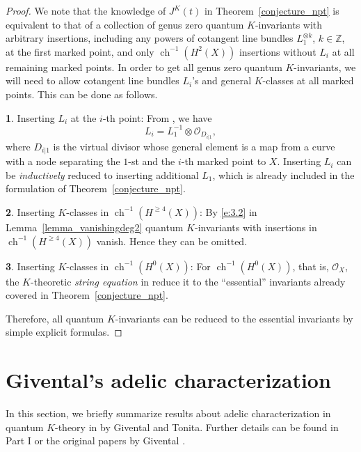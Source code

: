 \documentclass[11pt]{amsart}
\newtheorem*{main theorem*}{Main Theorem}
\theoremstyle{remark}
\numberwithin{equation}{section}
\newcommand{\op}{\operatorname}
\newcommand{\so}{\mathscr{O}}
\begin{document}
\begin{proof}
We note that the knowledge of $J^K (t)$ in Theorem~\ref{conjecture_npt} is equivalent to that of a collection of genus zero quantum $K$-invariants with arbitrary insertions, including any powers of cotangent line bundles $L_1^{\otimes k}$, $k\in \mathbb{Z}$, at the first marked point, and only $\op{ch}^{-1} (H^2(X))$ insertions without $L_i$ at all remaining marked points. 
In order to get all genus zero quantum $K$-invariants, we will need to allow cotangent line bundles $L_i$'s and general $K$-classes at all marked points. This can be done as follows.

\textbf{1}. Inserting $L_i$ at the $i$-th point: From \cite[(2)]{Lee_Pandharipande_2004}, we have
\[
 L_i = L_1^{-1} \otimes \so_{D_{i | 1}},
\]
where $D_{i|1}$ is the virtual divisor whose general element is a map from a curve with a node separating the $1$-st and the $i$-th marked point to $X$. Inserting $L_i$ can be \emph{inductively} reduced to inserting additional $L_1$, which is already included in the formulation of Theorem~\ref{conjecture_npt}.

\textbf{2}. Inserting $K$-classes in $\op{ch}^{-1} (H^{\ge4} (X))$: By \eqref{e:3.2} in Lemma~\ref{lemma_vanishingdeg2} quantum $K$-invariants with insertions in $\op{ch}^{-1} (H^{\ge4} (X))$ vanish. Hence they can be omitted.

\textbf{3}. Inserting $K$-classes in $\op{ch}^{-1} (H^0(X))$: For $\op{ch}^{-1} (H^0(X))$, that is, $\so_X$, the $K$-theoretic \emph{string equation} in \cite[(22)]{Lee_2004} reduce it to the ``essential'' invariants already covered in Theorem~\ref{conjecture_npt}.

Therefore, all quantum $K$-invariants can be reduced to the essential invariants by simple explicit formulas.
\end{proof}





\section{Givental's adelic characterization} \label{s:2}
In this section, we briefly summarize results about adelic characterization in quantum $K$-theory in \cite{Givental_Tonita_2011} by Givental and Tonita. Further details can be found in Part I \cite[\S~2.3]{Chou_Lee_2022_QKGVI} or the original papers by Givental \cite{Givental_ER_Coh_K_2015, Givental_PEV_Toric_2015, Givental_PEVIII_ER}.
\end{document}
